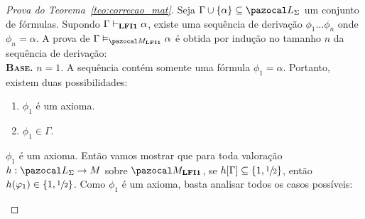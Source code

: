     \begin{proof}[Prova do Teorema~\ref{teo:correcao_mat}]
        Seja $\Gamma \cup \{\alpha\} \subseteq{} \ling{}$ um conjunto de fórmulas.
        Supondo $\Gamma \vdash_{{\normalfont\textbf{LFI1}}{}} \alpha$, existe uma sequência de derivação $\phi_{1} \ldots \phi_{n}$ onde $\phi_{n} = \alpha$. A prova de $\Gamma \conmat \alpha$ é obtida por indução no tamanho $n$ da sequência de derivação:\\

        \noindent \textbf{\textsc{Base.}} $n = 1$. A sequência contém somente uma fórmula $\phi_{1} = \alpha$. Portanto, existem duas possibilidades:
        \begin{enumerate}
            \item $\phi_{1}$ é um axioma.
            \item $\phi_{1} \in \Gamma$.
        \end{enumerate}

        \begin{provaporcasos}
            
            \casodeprova{} $\phi_{1}$ é um axioma. Então vamos mostrar que para toda valoração $h : \ling{} \to M$ sobre $\mat{}$, se $h[\Gamma] \subseteq \{1,\sfrac{1}{2}{}\}{}$, então $h(\varphi_{1}) \in \{1,\sfrac{1}{2}{}\}{}$. Como $\phi_{1}$ é um axioma, basta analisar todos os casos possíveis:


\end{provaporcasos}
\end{proof}
